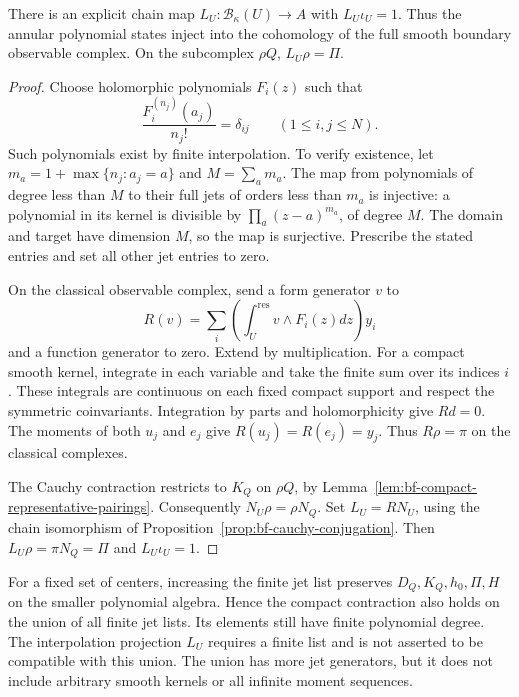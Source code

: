 \begin{proposition}
\label{prop:bf-compact-full-boundary-split}
There is an explicit chain map
$L_U:\mathcal B_\kappa(U)\to A$ with $L_U\iota_U=1$.
Thus the annular polynomial states inject into the cohomology of
the full smooth boundary observable complex.
On the subcomplex $\rho Q$, $L_U\rho=\Pi$.
\end{proposition}
\begin{proof}
Choose holomorphic polynomials $F_i(z)$ such that
\[
 \frac{F_i^{(n_j)}(a_j)}{n_j!}=\delta_{ij}
                   \qquad(1\le i,j\le N).
\]
Such polynomials exist by finite interpolation.  To verify existence,
let $m_a=1+\max\{n_j:a_j=a\}$ and $M=\sum_a m_a$.
The map from polynomials of degree less than $M$ to their full jets
of orders less than $m_a$ is injective: a polynomial in its kernel
is divisible by $\prod_a(z-a)^{m_a}$, of degree $M$.
The domain and target have dimension $M$, so the map is surjective.
Prescribe the stated entries and set all other jet entries to zero.

On the classical observable complex, send a form generator $v$ to
\[
 R(v)=\sum_i\left(\int_U^{\mathrm{res}}v\wedge F_i(z)dz\right)y_i
\]
and a function generator to zero.  Extend by multiplication.
For a compact smooth kernel, integrate in each variable and take
the finite sum over its indices $i$.  These integrals are continuous
on each fixed compact support and respect the symmetric coinvariants.
Integration by parts and holomorphicity give $Rd=0$.
The moments of both $u_j$ and $e_j$ give $R(u_j)=R(e_j)=y_j$.
Thus $R\rho=\pi$ on the classical complexes.

The Cauchy contraction restricts to $K_Q$ on $\rho Q$, by
Lemma~\ref{lem:bf-compact-representative-pairings}.
Consequently $N_U\rho=\rho N_Q$.
Set $L_U=RN_U$, using the chain isomorphism
of Proposition~\ref{prop:bf-cauchy-conjugation}.
Then $L_U\rho=\pi N_Q=\Pi$ and $L_U\iota_U=1$.
\end{proof}

For a fixed set of centers, increasing the finite jet list preserves
$D_Q,K_Q,h_0,\Pi,H$ on the smaller polynomial algebra.
Hence the compact contraction also holds on the union of all finite
jet lists.  Its elements still have finite polynomial degree.
The interpolation projection $L_U$ requires a finite list and is
not asserted to be compatible with this union.
The union has more jet generators, but it does not include arbitrary
smooth kernels or all infinite moment sequences.

